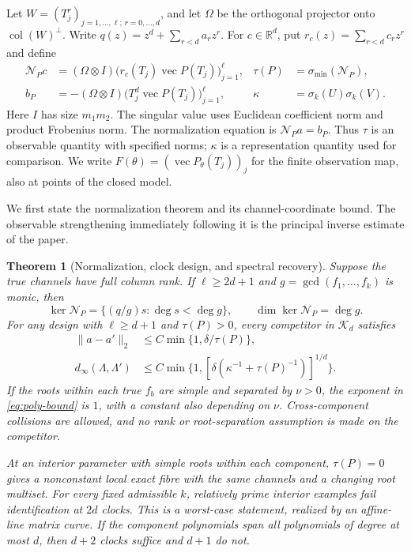 \documentclass[11pt,reqno]{amsart}
\numberwithin{equation}{section}
\newtheorem{theorem}{Theorem}[section]
\theoremstyle{definition}\newtheorem{definition}[theorem]{Definition}
\theoremstyle{remark}\newtheorem{remark}[theorem]{Remark}
\newcommand{\R}{\mathbb R}
\newcommand{\cK}{\mathcal K}
\newcommand{\cN}{\mathcal N}
\begin{document}
Let $W=(T_j^r)_{j=1,\ldots,\ell;\,r=0,\ldots,d}$, and let $\Omega$
be the orthogonal projector onto $\operatorname{col}(W)^\perp$. Write
$q(z)=z^d+\sum_{r<d}a_rz^r$. For $c\in\R^d$, put
$r_c(z)=\sum_{r<d}c_rz^r$ and define
\begin{align}
 \cN_Pc&=(\Omega\otimes I)
       \big(r_c(T_j)\operatorname{vec}P(T_j)\big)_{j=1}^{\ell},
       &\tau(P)&=\sigma_{\min}(\cN_P),\nonumber\\
 b_P&=-(\Omega\otimes I)
       \big(T_j^d\operatorname{vec}P(T_j)\big)_{j=1}^{\ell},
       &\kappa&=\sigma_k(U)\sigma_k(V).           \label{eq:normalization}
\end{align}
Here $I$ has size $m_1m_2$. The singular value uses Euclidean
coefficient norm and product Frobenius norm. The normalization equation
is $\cN_Pa=b_P$. Thus $\tau$ is an observable quantity with specified
norms; $\kappa$ is a representation quantity used for comparison.
We write $F(\theta)=(\operatorname{vec}P_\theta(T_j))_j$ for the
finite observation map, also at points of the closed model.

We first state the normalization theorem and its channel-coordinate
bound. The observable strengthening immediately following it is the
principal inverse estimate of the paper.
\begin{theorem}[Normalization, clock design, and spectral recovery]
\label{thm:main}
Suppose the true channels have full column rank. If $\ell\ge2d+1$
and $g=\gcd(f_1,\ldots,f_k)$ is monic, then
\begin{equation}\label{eq:kernel}
 \ker\cN_P=\{(q/g)s:\deg s<\deg g\},\qquad
 \dim\ker\cN_P=\deg g.
\end{equation}
For any design with $\ell\ge d+1$ and $\tau(P)>0$, every competitor
in $\cK_d$ satisfies
\begin{align}
 \|a-a'\|_2&\le C\min\{1,\delta/\tau(P)\},        \label{eq:q-bound}\\
 d_\infty(\Lambda,\Lambda')&\le
 C\min\{1,[\delta(\kappa^{-1}+\tau(P)^{-1})]^{1/d}\}.
                                                        \label{eq:poly-bound}
\end{align}
If the roots within each true $f_b$ are simple and separated by
$\nu>0$, the exponent in \eqref{eq:poly-bound} is $1$, with a constant
also depending on $\nu$. Cross-component collisions are allowed, and
no rank or root-separation assumption is made on the competitor.

At an interior parameter with simple roots within each component,
$\tau(P)=0$ gives a nonconstant local exact fibre with the same channels
and a changing root multiset. For every fixed admissible $k$, relatively
prime interior examples fail identification at $2d$ clocks. This is a
worst-case statement, realized by an affine-line matrix curve. If the
component polynomials span all polynomials of degree at most $d$, then
$d+2$ clocks suffice and $d+1$ do not.
\end{theorem}
\end{document}
